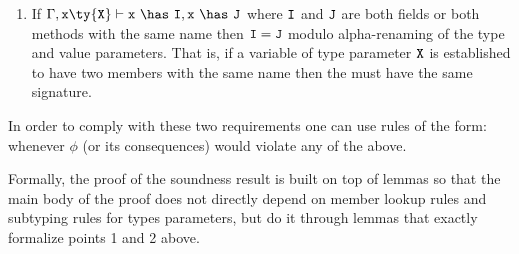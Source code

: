 {\begin{enumerate}
\item If $\Gamma,{\tt x}\ty{\tt X}\vdash{\tt x}~\has~{\tt I},{\tt x}~\has~{\tt J}$ where $\tt I$ and $\tt J$ are both fields or both methods with the same name then ${\tt I}={\tt J}$ modulo alpha-renaming of the type and value parameters. That is, if a variable of type parameter $\tt X$ is established to have two members with the same name then the must have the same signature.
\end{enumerate}
In order to comply with these two requirements one can use rules of the form:
\infrule {\Gamma\vdash \phi}{\Gamma\vdash\false} whenever $\phi$ (or its consequences) would violate any of the above.

Formally, the proof of the soundness result is built on top of lemmas so that the main body of the proof does not directly depend on member lookup rules and subtyping rules for types parameters, but do it through lemmas that exactly formalize points 1 and 2 above.

}









